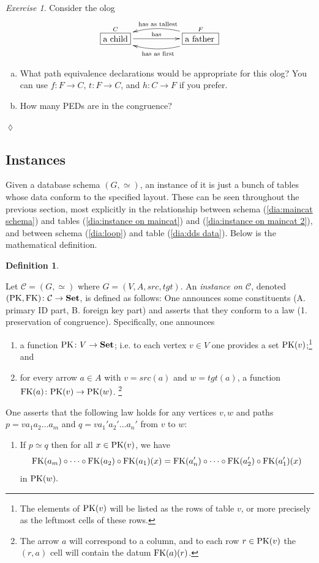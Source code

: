 \documentclass{book}
\def\tn{\textnormal}
\def\mc{\mathcal}
\def\PK{\tn{PK}}
\def\FK{\tn{FK}}
\def\hsp{\hspace{.3in}}
\def\to{\rightarrow}
\def\taking{\colon}
\newcommand{\LA}[2]{\ar[#1]^-{\tn {#2}}}
\newcommand{\obox}[3]{\stackrel{#1}{\fbox{\parbox{#2}{#3}}}}
\def\Set{{\bf Set}}
\def\mcC{\mc{C}}
\theoremstyle{remark}
\newtheorem{exc}[subsubsection]{Exercise}
\newenvironment{exercise}{\begin{exc}}{\hspace*{\fill}$\lozenge$\end{exc}}
\theoremstyle{definition}
\newtheorem{definition}[subsubsection]{Definition}
\def\sexc{\begin{enumerate}[a.)]\setlength{\itemsep}{.1cm}\setlength{\parskip}{.1cm}\item}
\def\next{\item}
\def\endsexc{\end{enumerate}}
\begin{document}
\begin{exercise}\label{exc:father and child}
Consider the olog 
$$
\xymatrix{\obox{C}{.4in}{a child}\LA{rr}{has}&&\obox{F}{.5in}{a father}\ar@/^1pc/[ll]^{\tn{has as first}}\ar@/_1pc/[ll]_{\tn{has as tallest}}}
$$
\sexc What path equivalence declarations would be appropriate for this olog? You can use $f\taking F\to C$, $t\taking F\to C$, and $h\taking C\to F$ if you prefer. 
\next How many PEDs are in the congruence?
\endsexc
\end{exercise}


\subsection{Instances}

Given a database schema $(G,\simeq)$, an instance of it is just a bunch of tables whose data conform to the specified layout. These can be seen throughout the previous section, most explicitly in the relationship between schema (\ref{dia:maincat schema}) and tables (\ref{dia:instance on maincat}) and (\ref{dia:instance on maincat 2}), and between schema (\ref{dia:loop}) and table (\ref{dia:dds data}). Below is the mathematical definition.

\begin{definition}\label{def:instance}

Let $\mcC=(G,\simeq)$ where $G=(V,A,src,tgt)$. An {\em instance on $\mcC$}, denoted $(\PK,\FK)\taking\mcC\to\Set$, is defined as follows: One announces some constituents (A. primary ID part, B. foreign key part) and asserts that they conform to a law (1. preservation of congruence). Specifically, one announces
\begin{enumerate}[\hsp A.]
\item a function $\PK\taking V\to \Set$; i.e. to each vertex $v\in V$ one provides a set $\PK(v)$;\footnote{The elements of $\PK(v)$ will be listed as the rows of table $v$, or more precisely as the leftmost cells of these rows.} and
\item for every arrow $a\in A$ with $v=src(a)$ and $w=tgt(a)$, a function $\FK(a)\taking\PK(v)\to\PK(w)$.
\footnote{The arrow $a$ will correspond to a column, and to each row $r\in\PK(v)$ the $(r,a)$ cell will contain the datum $\FK(a)(r)$.}
\end{enumerate}
One asserts that the following law holds for any vertices $v, w$ and paths $p=va_1a_2\ldots a_m$ and $q=va_1'a_2'\ldots a_n'$ from $v$ to $w$:
\begin{enumerate}[\hsp 1.]
\item If $p\simeq q$ then for all $x\in\PK(v)$, we have $$\FK(a_m)\circ\cdots\circ\FK(a_2)\circ\FK(a_1)(x)=\FK(a_n')\circ\cdots\circ\FK(a_2')\circ\FK(a_1')(x)$$ in $\PK(w).$
\end{enumerate}

\end{definition}
\end{document}
